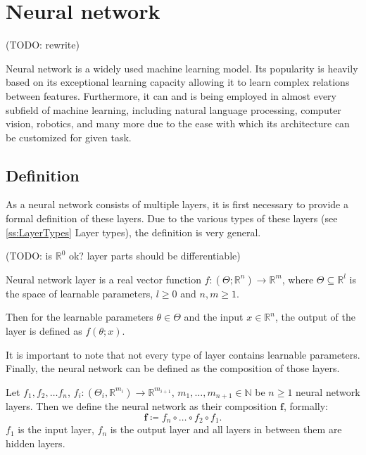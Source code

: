 
\section{Neural network}

(TODO: rewrite)

Neural network is a widely used machine learning model.
Its popularity is heavily based on its exceptional learning capacity allowing it to learn complex relations between features.
Furthermore, it can and is being employed in almost every subfield of machine learning, including natural language processing, computer vision, robotics, and many more due to the ease with which its architecture can be customized for given task.

\subsection{Definition}

As a neural network consists of multiple layers, it is first necessary to provide a formal definition of these layers.
Due to the various types of these layers (see \ref{ss:LayerTypes} Layer types), the definition is very general.

(TODO: is $\mathbb{R}^0$ ok? layer parts should be differentiable)
\begin{definition}
\label{d:layer}
    Neural network layer is a real vector function $f: (\Theta; \mathbb{R}^n) \to \mathbb{R}^m$, where $\Theta \subseteq \mathbb{R}^l$ is the space of learnable parameters, $l \ge 0$ and $n, m \ge 1$.
     
     Then for the learnable parameters $\theta \in \Theta$ and the input $x \in \mathbb{R}^n$, the output of the layer is defined as $f(\theta; x)$. 
\end{definition}

It is important to note that not every type of layer contains learnable parameters.
Finally, the neural network can be defined as the composition of those layers.

\begin{definition}
    Let $f_1, f_2, \dots f_n$, $f_i : (\Theta_i, \mathbb{R}^{m_i}) \to \mathbb{R}^{m_{i + 1}}$, $m_1, \dots, m_{n+1} \in \mathbb{N}$ be $n \ge 1$ neural network layers.
    Then we define the neural network as their composition $\mathbf{f}$, formally:
    $$\mathbf{f} \coloneqq f_n \circ \dots  \circ  f_2 \circ f_1.$$
    $f_1$ is the input layer, $f_n$ is the output layer and all layers in between them are hidden layers. 
\end{definition}


